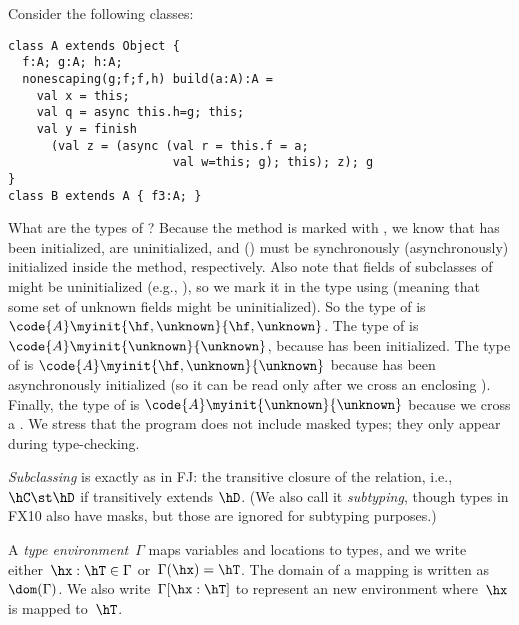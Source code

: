 Consider the following classes:
\begin{lstlisting}
class A extends Object {
  f:A; g:A; h:A;
  nonescaping(g;f;f,h) build(a:A):A =
    val x = this;
    val q = async this.h=g; this;
    val y = finish
      (val z = (async (val r = this.f = a;
                       val w=this; g); this); z); g
}
class B extends A { f3:A; }
\end{lstlisting}
What are the types of ?
Because the method is marked with , %
    we know that  has been initialized,
     are uninitialized,
    and
     () must be synchronously (asynchronously) initialized inside the method, respectively.
Also note that fields of subclasses of  might be uninitialized (e.g., ),
    so we mark it in the type using \unknown (meaning that some set of unknown fields might be uninitialized).
So the type of  is %
    $\code{A}\myinit{\hf,\unknown}{\hf,\unknown}$.
The type of  is
    $\code{A}\myinit{\unknown}{\unknown}$,
    because  has been initialized.
The type of  is
    $\code{A}\myinit{\hf,\unknown}{\unknown}$
    because  has been asynchronously initialized
    (so it can be read only after we cross an enclosing \finish).
Finally,
    the type of  is
    $\code{A}\myinit{\unknown}{\unknown}$
    because we cross a \finish.
We stress that the program does not include masked types;
    they only appear during type-checking.




\emph{Subclassing} is exactly as in FJ:
    the transitive closure of the \hextends relation,
    i.e., $\hC \st \hD$ if \hC transitively extends $\hD$.
(We also call it \emph{subtyping}, though types in FX10 also have masks,
    but those are ignored for subtyping purposes.)

A \emph{type environment}~$\Gamma$ maps variables and locations to types,
    and we write either~$\hx:\hT \in \Gamma$ or~$\Gamma(\hx)=\hT$.
The domain of a mapping is written as~$\dom(\Gamma)$.
We also write~$\Gamma[\hx:\hT]$ to represent an new environment where~$\hx$ is mapped to~$\hT$.

